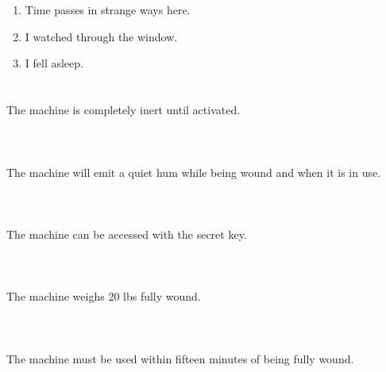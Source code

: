 \documentclass{article}
\begin{document}
    \newpage
    
    \section{}
    
    \begin{enumerate}
    
    \item Time passes in strange ways here.\\
    
    \item I watched through the window.\\
    
    \item I fell asleep.\\
    
    \end{enumerate}
     
    \newpage
    
    \section{}
    The machine is completely inert until activated.\\\\ 
    \newpage
    
    \section{}
    The machine will emit a quiet hum while being wound and when it is in use.\\\\ 
    \newpage
    
    \section{}
    The machine can be accessed with the secret key.\\\\ 
    \newpage
    
    \section{}
    The machine weighs 20 lbs fully wound.\\\\ 
    \newpage
    
    \section{}
    The machine must be used within fifteen minutes of being fully wound.\\\\ 
    \newpage
    
\end{document}
